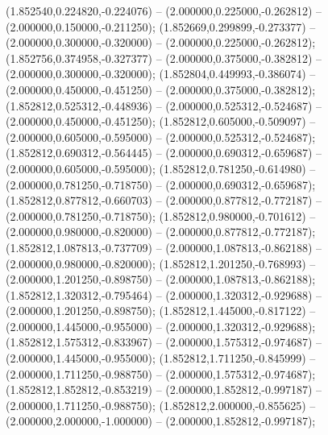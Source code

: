  (1.852540,0.224820,-0.224076) -- (2.000000,0.225000,-0.262812) -- (2.000000,0.150000,-0.211250);
 (1.852669,0.299899,-0.273377) -- (2.000000,0.300000,-0.320000) -- (2.000000,0.225000,-0.262812);
 (1.852756,0.374958,-0.327377) -- (2.000000,0.375000,-0.382812) -- (2.000000,0.300000,-0.320000);
 (1.852804,0.449993,-0.386074) -- (2.000000,0.450000,-0.451250) -- (2.000000,0.375000,-0.382812);
 (1.852812,0.525312,-0.448936) -- (2.000000,0.525312,-0.524687) -- (2.000000,0.450000,-0.451250);
 (1.852812,0.605000,-0.509097) -- (2.000000,0.605000,-0.595000) -- (2.000000,0.525312,-0.524687);
 (1.852812,0.690312,-0.564445) -- (2.000000,0.690312,-0.659687) -- (2.000000,0.605000,-0.595000);
 (1.852812,0.781250,-0.614980) -- (2.000000,0.781250,-0.718750) -- (2.000000,0.690312,-0.659687);
 (1.852812,0.877812,-0.660703) -- (2.000000,0.877812,-0.772187) -- (2.000000,0.781250,-0.718750);
 (1.852812,0.980000,-0.701612) -- (2.000000,0.980000,-0.820000) -- (2.000000,0.877812,-0.772187);
 (1.852812,1.087813,-0.737709) -- (2.000000,1.087813,-0.862188) -- (2.000000,0.980000,-0.820000);
 (1.852812,1.201250,-0.768993) -- (2.000000,1.201250,-0.898750) -- (2.000000,1.087813,-0.862188);
 (1.852812,1.320312,-0.795464) -- (2.000000,1.320312,-0.929688) -- (2.000000,1.201250,-0.898750);
 (1.852812,1.445000,-0.817122) -- (2.000000,1.445000,-0.955000) -- (2.000000,1.320312,-0.929688);
 (1.852812,1.575312,-0.833967) -- (2.000000,1.575312,-0.974687) -- (2.000000,1.445000,-0.955000);
 (1.852812,1.711250,-0.845999) -- (2.000000,1.711250,-0.988750) -- (2.000000,1.575312,-0.974687);
 (1.852812,1.852812,-0.853219) -- (2.000000,1.852812,-0.997187) -- (2.000000,1.711250,-0.988750);
 (1.852812,2.000000,-0.855625) -- (2.000000,2.000000,-1.000000) -- (2.000000,1.852812,-0.997187);
